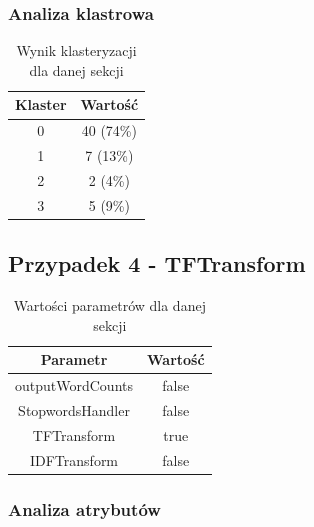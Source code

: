\documentclass[../EDI_Task2_Karwowski_Kowalewski.tex]{subfiles}
\begin{document}
{{        \subsubsection{Analiza klastrowa} {

            \begin{table}[!htbp]
                \small
                \centering
                \begin{tabular}{|c|c|}
                    \hline
                    Klaster & Wartość \\ \hline
                    0   &  40 (74\%) \\
                    1   &   7 (13\%) \\
                    2   &   2 (4\%) \\
                    3   &   5 (9\%) \\ \hline
                \end{tabular}
                \caption{Wynik klasteryzacji dla danej sekcji}
            \end{table}
            \FloatBarrier
        }
    }

    \subsection{Przypadek 4 - TFTransform} {

        \begin{table}[!htbp]
            \small
            \centering
            \begin{tabular}{|c|c|}
                \hline
                Parametr & Wartość \\ \hline
                outputWordCounts & false \\ \hline
                StopwordsHandler & false \\ \hline
                TFTransform & true \\ \hline
                IDFTransform & false \\ \hline
            \end{tabular}
            \caption{Wartości parametrów dla danej sekcji}
        \end{table}
        \FloatBarrier

        \subsubsection{Analiza atrybutów} {

}}}
\end{document}
